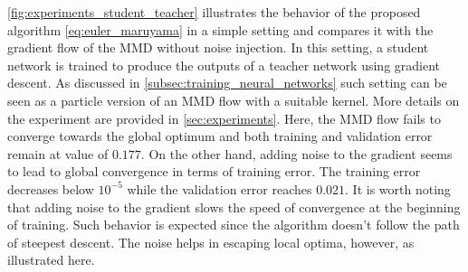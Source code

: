 \cref{fig:experiments_student_teacher} illustrates the behavior of the proposed algorithm \cref{eq:euler_maruyama} in a simple setting and compares it with the gradient flow of the MMD without noise injection. In this setting, a student network is trained to produce the outputs of a teacher network using gradient descent. As discussed in \cref{subsec:training_neural_networks} such setting can be seen as a particle version of an MMD flow with a suitable kernel. More details on the experiment are provided in \cref{sec:experiments}. Here, the MMD flow  fails to converge towards the global optimum and both training and validation error remain at value of $0.177$. On the other hand, adding noise to the gradient seems to lead to global convergence in terms of training error. The training error decreases below $10^{-5}$ while the validation error reaches $0.021$. It is worth noting that adding noise to the gradient slows the speed of convergence at the beginning of training. Such behavior is expected since the algorithm doesn't follow the path of steepest descent. The noise helps in escaping local optima, however, as illustrated here.




